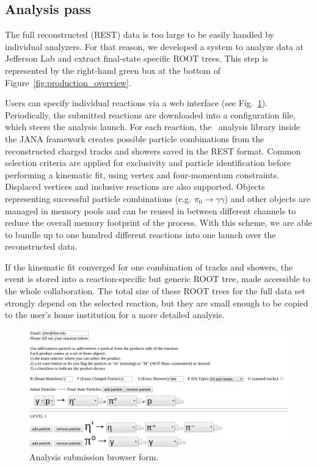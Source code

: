 \subsection{Analysis pass \label{sec:recanalysis}}

The full reconstructed (REST) data is too large to be easily handled by individual analyzers. For that reason, we developed a system to analyze data at Jefferson Lab and extract final-state specific ROOT trees. This step is represented by the right-hand green box at the bottom of Figure~\ref{fig:production_overview}.

Users can specify individual reactions via a web interface (see Fig.~\ref{fig:production_analysis}). Periodically, the submitted reactions are downloaded into a configuration file, which steers the analysis launch. For each reaction, the \GX~analysis library inside the JANA framework creates possible particle combinations from the reconstructed charged tracks and showers saved in the REST format. Common selection criteria are applied for exclusivity and particle identification before performing a kinematic fit, using vertex and four-momentum constraints. Displaced vertices and inclusive reactions are also supported. Objects representing successful particle combinations (e.g. $\pi_0 \rightarrow \gamma\gamma$) and other objects are managed in memory pools and can be reused in between different channels to reduce the overall memory footprint of the process. With this scheme, we are able to bundle up to one hundred different reactions into one launch over the reconstructed data.

If the kinematic fit converged for one combination of tracks and showers, the event is stored into a reaction-specific but generic ROOT tree, made accessible to the whole collaboration. The total size of these ROOT trees for the full data set strongly depend on the selected reaction, but they are small enough to be copied to the user's home institution for a more detailed analysis.

\begin{figure}[h!]\centering
\includegraphics[width=\textwidth]{figures/analysis_submit_form.png}
\caption[]{\label{fig:production_analysis}Analysis submission browser form.} 
\end{figure}